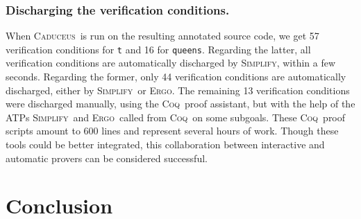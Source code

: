 \documentclass[a4paper]{llncs}
\newcommand{\caduceus}{\textsc{Caduceus}}
\newcommand{\simplify}{\textsc{Simplify}}
\newcommand{\ergo}{\textsc{Ergo}}
\newcommand{\coq}{\textsc{Coq}}
\begin{document}
\subsubsection{Discharging the verification conditions.}
When \caduceus\ is run on the resulting annotated source code, we get
57 verification conditions for \texttt{t} and 16 for
\texttt{queens}. Regarding the latter, all verification conditions are
automatically discharged by \simplify, within a few seconds.
Regarding the former, only 44 verification conditions are
automatically discharged, either by \simplify\ or \ergo.
The remaining 13 verification conditions were discharged manually,
using the \coq\ proof assistant, but with the help of the ATPs
\simplify\ and \ergo\ called from \coq\ on some subgoals. These \coq\
proof scripts amount to 600 lines and represent several hours of
work. Though these tools could be better integrated, this
collaboration between interactive and automatic provers can be
considered successful.

\section{Conclusion}\label{conclu}
\end{document}
